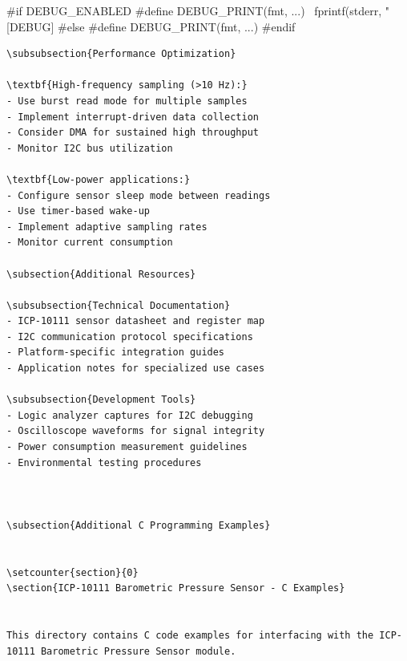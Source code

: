 \documentclass[11pt,a4paper]{article}
\begin{document}
#if DEBUG_ENABLED
    #define DEBUG_PRINT(fmt, ...) \
        fprintf(stderr, "[DEBUG] %
#else
    #define DEBUG_PRINT(fmt, ...)
#endif
\begin{lstlisting}[language=text]
\subsubsection{Performance Optimization}

\textbf{High-frequency sampling (>10 Hz):}
- Use burst read mode for multiple samples
- Implement interrupt-driven data collection
- Consider DMA for sustained high throughput
- Monitor I2C bus utilization

\textbf{Low-power applications:}
- Configure sensor sleep mode between readings
- Use timer-based wake-up
- Implement adaptive sampling rates
- Monitor current consumption

\subsection{Additional Resources}

\subsubsection{Technical Documentation}
- ICP-10111 sensor datasheet and register map
- I2C communication protocol specifications  
- Platform-specific integration guides
- Application notes for specialized use cases

\subsubsection{Development Tools}
- Logic analyzer captures for I2C debugging
- Oscilloscope waveforms for signal integrity
- Power consumption measurement guidelines
- Environmental testing procedures



\subsection{Additional C Programming Examples}


\setcounter{section}{0}
\section{ICP-10111 Barometric Pressure Sensor - C Examples}


This directory contains C code examples for interfacing with the ICP-10111 Barometric Pressure Sensor module.


\end{lstlisting}
\end{document}
